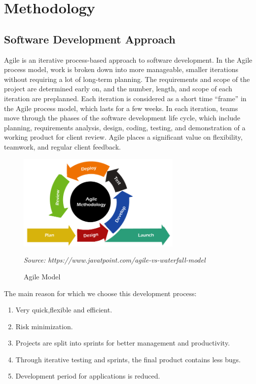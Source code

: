 \chapter{Methodology} \sloppy
\section{Software Development Approach}
 Agile is an iterative process-based approach to software development. In the Agile process model, work is broken down into more manageable, smaller iterations without requiring a lot of long-term planning. The requirements and scope of the project are determined early on, and the number, length, and scope of each iteration are preplanned. Each iteration is considered as a short time ``frame'' in the Agile process model, which lasts for a few weeks. In each iteration, teams move through the phases of the software development life cycle, which include planning, requirements analysis, design, coding, testing, and demonstration of a working product for client review. Agile places a significant value on flexibility, teamwork, and regular client feedback.\\
\begin{figure}[H]
    \centering
    \includegraphics[width=80mm]{./img/agile.png}
    \caption*{\small{\textit{Source: https://www.javatpoint.com/agile-vs-waterfall-model}}}
    \caption{Agile Model}
\end{figure}
The main reason for which  we choose this development process:
\begin{enumerate}[noitemsep] %
\item Very quick,flexible and efficient.
\item Risk minimization.
\item Projects are split into sprints for better management and productivity.
\item Through iterative testing and sprints, the final product contains less bugs. 
\item Development period for applications is reduced.
\end{enumerate}
